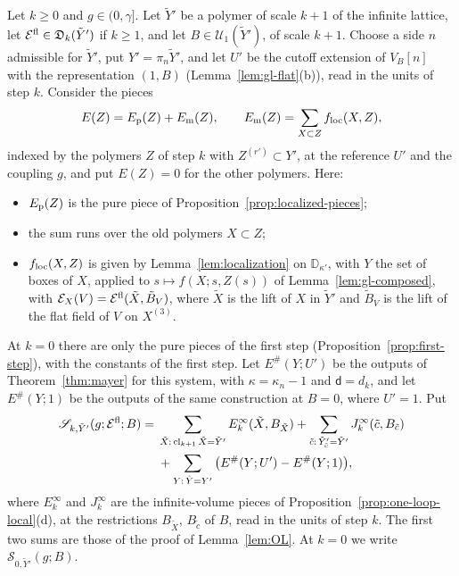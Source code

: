\begin{definition}\label{def:gl-functional}
Let $k\ge0$ and $g\in(0,\gamma]$. Let $\tilde Y'$ be a polymer of scale $k+1$ of the infinite lattice, let $\mathcal E^{\rm fl}\in\mathfrak D_k(\tilde Y')$ if $k\ge1$, and let $B\in\mathcal U_1(\tilde Y')$, of scale $k+1$. Choose a side $n$ admissible for $\tilde Y'$, put $Y'=\pi_n\tilde Y'$, and let $U'$ be the cutoff extension of $V_B[n]$ with the representation $(1,B)$ (Lemma~\ref{lem:gl-flat}(b)), read in the units of step $k$. Consider the pieces
\[
E(Z)=E_{\rm p}(Z)+E_{\rm m}(Z),\qquad E_{\rm m}(Z)=\sum_{X\subset Z}f_{\rm loc}(X,Z),
\]
indexed by the polymers $Z$ of step $k$ with $Z^{(r')}\subset Y'$, at the reference $U'$ and the coupling $g$, and put $E(Z)=0$ for the other polymers. Here:
\begin{itemize}
\item $E_{\rm p}(Z)$ is the pure piece of Proposition~\ref{prop:localized-pieces};
\item the sum runs over the old polymers $X\subset Z$;
\item $f_{\rm loc}(X,Z)$ is given by Lemma~\ref{lem:localization} on $\mathbb D_{\kappa'}$, with $Y$ the set of boxes of $X$, applied to $s\mapsto f(X;s,Z(s))$ of Lemma~\ref{lem:gl-composed}, with $\mathcal E_X(V)=\mathcal E^{\rm fl}(\tilde X,\tilde B_V)$, where $\tilde X$ is the lift of $X$ in $\tilde Y'$ and $\tilde B_V$ is the lift of the flat field of $V$ on $X^{(3)}$.
\end{itemize}
At $k=0$ there are only the pure pieces of the first step (Proposition~\ref{prop:first-step}), with the constants of the first step. Let $E^\#(Y;U')$ be the outputs of Theorem~\ref{thm:mayer} for this system, with $\kappa=\kappa_n-1$ and $\mathsf d=d_k$, and let $E^\#(Y;1)$ be the outputs of the same construction at $B=0$, where $U'=1$. Put
\[
\begin{aligned}
\mathscr S_{k,\tilde Y'}(g;\mathcal E^{\rm fl};B)={}&\sum_{\tilde X:\,\operatorname{cl}_{k+1}\tilde X=\tilde Y'}E^\infty_k(\tilde X,B_{\tilde X})+\sum_{\tilde c:\,\tilde Y'_{\tilde c}=\tilde Y'}J^\infty_k(\tilde c,B_{\tilde c})\\
&+\sum_{Y:\,\hat Y=Y'}\big(E^\#(Y;U')-E^\#(Y;1)\big),
\end{aligned}
\]
where $E^\infty_k$ and $J^\infty_k$ are the infinite-volume pieces of Proposition~\ref{prop:one-loop-local}(d), at the restrictions $B_{\tilde X}$, $B_{\tilde c}$ of $B$, read in the units of step $k$. The first two sums are those of the proof of Lemma~\ref{lem:OL}. At $k=0$ we write $\mathscr S_{0,\tilde Y'}(g;B)$.
\end{definition}

